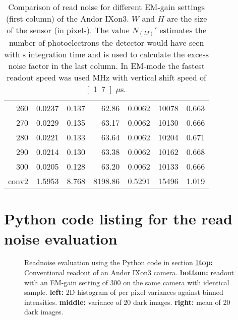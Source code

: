 \begin{table}[!htbp]
\begin{tabular}{r l l r  l r l}
260 & 0.0237 & 0.137 & 62.86 & 0.0062 & 10078 & 0.663 \\
270 & 0.0229 & 0.135 & 63.17 & 0.0062 & 10130 & 0.666 \\
280 & 0.0221 & 0.133 & 63.64 & 0.0062 & 10204 & 0.671 \\
290 & 0.0214 & 0.130 & 63.38 & 0.0062 & 10162 & 0.668 \\
300 & 0.0205 & 0.128 & 63.20 & 0.0062 & 10133 & 0.666 \\
conv2 & 1.5953 & 8.768 & 8198.86 & 0.5291 & 15496 & 1.019 \\
\hline
\end{tabular}
\caption{Comparison of read noise for different EM-gain settings
  (first column) of the Andor IXon3. $W$ and $H$ are the size of the sensor (in pixels). The value $N_{(M)}'$
  estimates the number of photoelectrons the detector would have
  seen with \unit[1]{s} integration time and is used to calculate
  the excess noise factor in the last column. In EM-mode the fastest
  readout speed was used \unit[10]{MHz} with vertical shift speed of
  \unit[1.7]{$\mu$s}.}
  \label{tab:ixon-table}
\end{table}

\newpage

\section{Python code listing for the read noise evaluation}
\label{sec:python-readnoise-eval}

\begin{figure}
  \centering
  \caption{Readnoise evaluation using the Python code in section
    \ref{sec:python-readnoise-eval}{\bf top:} Conventional readout of
    an Andor IXon3 camera. {\bf bottom:} readout with an EM-gain
    setting of 300 on the same camera with identical sample. {\bf
      left:} 2D histogram of per pixel variances against binned
    intensities. {\bf middle:} variance of 20 dark images. {\bf
      right:} mean of 20 dark images.}
  \label{fig:ixon}
\end{figure}
  


